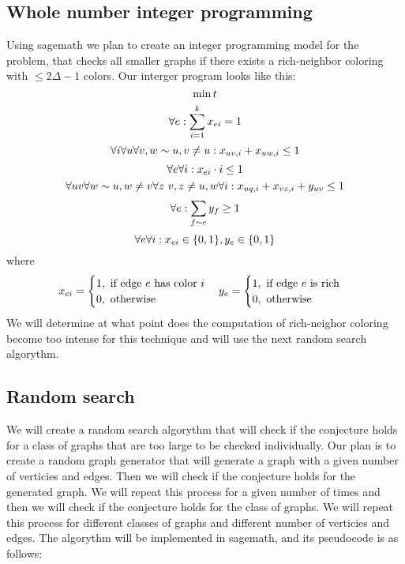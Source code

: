 \documentclass[12pt,a4paper]{amsart}
\theoremstyle{definition} %
\theoremstyle{plain} %
\begin{document}
\subsection{Whole number integer programming}
    Using sagemath we plan to create an integer programming model for the problem, that checks all smaller graphs 
    if there exists a rich-neighbor coloring with $\leq2\Delta - 1$ colors. Our interger program looks like this:
    $$
    \min t \\
    $$
    $$
    \forall e: \sum_{i=1}^{k} x_{ei} = 1 \\
    $$
    $$\forall i\forall u \forall v, w \sim u, v \neq u: x_{uv, i} + x_{uw, i} \leq 1 \\$$
    $$\forall e \forall i: x_{ei} \cdot i \leq 1 \\$$
    $$\forall uv \forall w \sim u, w \neq v \forall z ~ v, z \neq u, w \forall i: x_{uq, i} + x_{vz, i} + y_{uv} \leq 1 \\$$
    $$\forall e: \sum_{f \sim e}y_f \geq 1 \\$$
    $$
    \forall e \forall i: x_{ei} \in \{0, 1\}, y_{e} \in \{0, 1\} \\
    $$
    where
    $$        x_{ei} = \begin{cases}
                1, \  \text{if edge $e$ has color $i$} \\
                0, \  \text{otherwise}
        \end{cases} \\
            y_{e} = \begin{cases}
                1, \  \text{if edge $e$ is rich} \\
                0, \  \text{otherwise}
            \end{cases}
     $$
     We will determine at what point does the computation of rich-neighor coloring become too intense for this technique and 
     will use the next random search algorythm.

     \subsection{Random search}
        We will create a random search algorythm that will check if the conjecture holds for a class of graphs that are too large to be checked individually. Our plan is to create a random graph generator that will generate a graph with a given number of verticies and edges. Then we will check if the conjecture holds for the generated graph. We will repeat this process for a given number of times and then we will check if the conjecture holds for the class of graphs. We will repeat this process for different classes of graphs and different number of verticies and edges. The algorythm will be implemented in sagemath, and its pseudocode is as follows:
\end{document}
